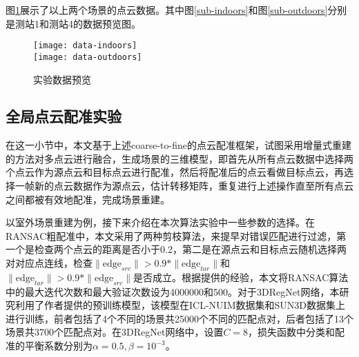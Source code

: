 图\ref{registration-data}展示了以上两个场景的点云数据。其中图\ref{sub-indoors}和图\ref{sub-outdoors}分别是测站1和测站4的数据预览图。
\begin{figure}
	\centering
	{\texttt{[image: data-indoors]}}\\
	{\texttt{[image: data-outdoors]}}
	\caption{实验数据预览}
	\label{registration-data}
\end{figure}

\subsection{全局点云配准实验}
\label{global-registration-experiment}
在这一小节中，本文基于上述coarse-to-fine的点云配准框架，试图采用增量式重建的方法对多点云进行融合，生成场景的三维模型，即首先从所有点云数据中选择两个点云作为源点云和目标点云进行配准，然后将配准后的点云看做目标点云，再选择一帧新的点云数据作为源点云，估计转移矩阵，重复进行上述操作直至所有点云之间都被有效地配准，完成场景重建。

以室外场景重建为例，接下来介绍在本次算法实验中一些参数的选择。在RANSAC粗配准中，本文采用了两种剪枝算法，来提早对错误匹配进行过滤，第一个是检查两个点云的距离是否小于0.2，第二是在源点云和目标点云随机选择两对对应点连线，检查$\|\text{edge}_{src}\|>0.9*\|\text{edge}_{tar}\|$和$\|\text{edge}_{tar}\|>0.9*\|\text{edge}_{src}\|$是否成立。根据\citet{choi2015robust}提供的经验，本文将RANSAC算法中的最大迭代次数和最大验证次数设为4000000和500。对于3DRegNet网络，本研究利用了作者提供的预训练模型，该模型在ICL-NUIM数据集和SUN3D数据集\cite{zhou2014learning}上进行训练，前者包括了4个不同的场景共25000个不同的匹配点对，后者包括了13个场景共3700个匹配点对。在3DRegNet网络中，设置$C=8$，损失函数中分类和配准的平衡系数分别为$\alpha=0.5, \beta=10^{-3}$。

